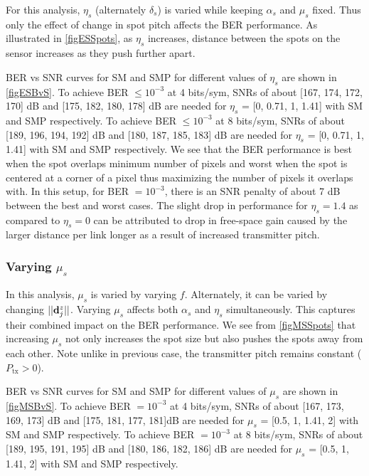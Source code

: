 For this analysis, $\eta_{s}$ (alternately $\delta_{s}$) is varied while keeping $\alpha_{s}$ and $\mu_{s}$ fixed. Thus only the effect of change in spot pitch affects the BER performance. As illustrated in \figurename{ \ref{figESSpots}}, as $\eta_{s}$ increases, distance between the spots on the sensor increases as they push further apart.

BER vs SNR curves for SM and SMP for different values of $\eta_{s}$ are shown in \figurename{ \ref{figESBvS}}. To achieve BER $\leq 10^{-3}$ at 4 bits/sym, SNRs of about [167, 174, 172, 170] dB and [175, 182, 180, 178] dB are needed for $\eta_{s}$ = [0, 0.71, 1, 1.41] with SM and SMP respectively. To achieve BER $\leq 10^{-3}$ at 8 bits/sym, SNRs of about [189, 196, 194, 192] dB and [180, 187, 185, 183] dB are needed for $\eta_{s}$ = [0, 0.71, 1, 1.41] with SM and SMP respectively. We see that the BER performance is best when the spot overlaps minimum number of pixels and worst when the spot is centered at a corner of a pixel thus maximizing the number of pixels it overlaps with. In this setup, for BER $=10^{-3}$, there is an SNR penalty of about 7 dB between the best and worst cases. The slight drop in performance for $\eta_{s}=1.4$ as compared to $\eta_{s}=0$ can be attributed to drop in free-space gain caused by the larger distance per link longer as a result of increased transmitter pitch.

\subsubsection{Varying $\mu_{s}$}
\label{subsubsec:osmResultsMu}
In this analysis, $\mu_{s}$ is varied by varying $f$. Alternately, it can be varied by changing $||{\bf{d}}^{z}_{j}||$. Varying $\mu_{s}$ affects both $\alpha_{s}$ and $\eta_{s}$ simultaneously. This captures their combined impact on the BER performance. We see from \figurename{ \ref{figMSSpots}} that increasing $\mu_{s}$ not only increases the spot size but also pushes the spots away from each other. Note unlike in previous case, the transmitter pitch remains constant ($P_{\text{tx}}>0$).

BER vs SNR curves for SM and SMP for different values of $\mu_{s}$ are shown in \figurename{ \ref{figMSBvS}}. To achieve BER $=10^{-3}$ at 4 bits/sym, SNRs of about [167, 173, 169, 173] dB and [175, 181, 177, 181]dB are needed for $\mu_{s}$ = [0.5, 1, 1.41, 2] with SM and SMP respectively. To achieve BER $=10^{-3}$ at 8 bits/sym, SNRs of about [189, 195, 191, 195] dB and [180, 186, 182, 186] dB are needed for $\mu_{s}$ = [0.5, 1, 1.41, 2] with SM and SMP respectively.

